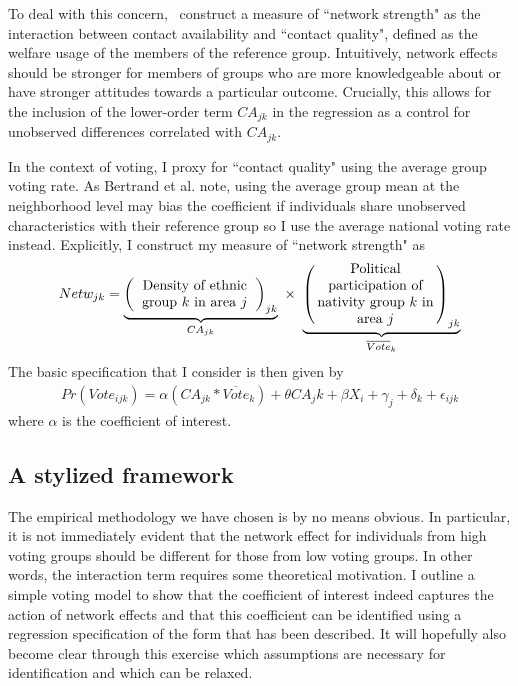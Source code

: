 \documentclass[11pt, oneside]{article}   	%
\newcommand{\eqs}[1]{\begin{align*}#1\end{align*}}
\begin{document}
To deal with this concern,~\cite{Bertrand2000} construct a measure of ``network strength" as the interaction between contact availability and ``contact quality", defined as the welfare usage of the members of the reference group. Intuitively, network effects should be stronger for members of groups who are more knowledgeable about or have stronger attitudes towards a particular outcome. Crucially, this allows for the inclusion of the lower-order term $CA_{jk}$ in the regression as a control for unobserved differences correlated with $CA_{jk}$.

In the context of voting, I proxy for ``contact quality" using the average group voting rate. As Bertrand et al. note, using the average group mean at the neighborhood level may bias the coefficient if individuals share unobserved characteristics with their reference group so I use the average national voting rate instead. Explicitly, I construct my measure of ``network strength" as
\eqs{
	Netw_{jk}=\underbrace{\left( \parbox[c]{1.2in}{\centering
                       Density of ethnic group $k$ in area $j$}
            \right)_{jk}}_{CA_{jk}} \ \times \ \underbrace{\left( \parbox[c]{1.2in}{\centering
                       Political participation of nativity group $k$ in area $j$}
            \right)_{jk}}_{\overline{Vote}_k}
}
The basic specification that I consider is then given by
\eqs{
	Pr(Vote_{ijk}) = \alpha (CA_{jk} * \overline{Vote}_k) + \theta CA_jk + \beta X_i + \gamma_j +\delta_k + \epsilon_{ijk}
}
where $\alpha$ is the coefficient of interest.


\subsection{A stylized framework}

The empirical methodology we have chosen is by no means obvious. In particular, it is not immediately evident that the network effect for individuals from high voting groups should be different for those from low voting groups. In other words, the interaction term requires some theoretical motivation. I outline a simple voting model to show that the coefficient of interest indeed captures the action of network effects and that this coefficient can be identified using a regression specification of the form that has been described. It will hopefully also become clear through this exercise which assumptions are necessary for identification and which can be relaxed.
\end{document}
